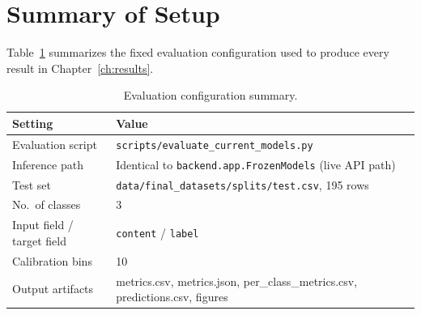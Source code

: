 \section{Summary of Setup}

Table~\ref{tab:eval-setup} summarizes the fixed evaluation configuration used to produce every result in Chapter~\ref{ch:results}.

\begin{table}[H]
\centering
\caption{Evaluation configuration summary.}
\label{tab:eval-setup}
\begin{tabular}{lp{9.5cm}}
\toprule
\textbf{Setting} & \textbf{Value} \\
\midrule
Evaluation script & \texttt{scripts/evaluate\_current\_models.py} \\
Inference path & Identical to \texttt{backend.app.FrozenModels} (live API path) \\
Test set & \texttt{data/final\_datasets/splits/test.csv}, 195 rows \\
No.\ of classes & 3 \\
Input field / target field & \texttt{content} / \texttt{label} \\
Calibration bins & 10 \\
Output artifacts & metrics.csv, metrics.json, per\_class\_metrics.csv, predictions.csv, figures \\
\bottomrule
\end{tabular}
\end{table}
